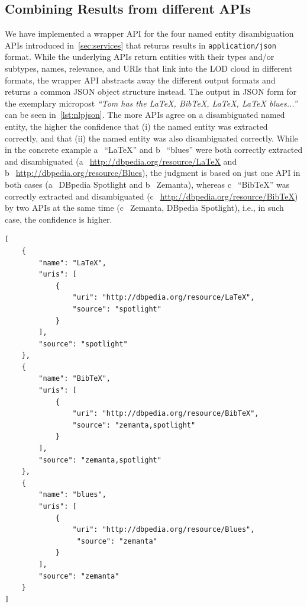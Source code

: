 \documentclass{iosart2c}
\begin{document}
\subsection{Combining Results from different APIs}                     \label{sec:consolidation-nlp}
We have implemented a wrapper API for the four named entity disambiguation APIs introduced in~\autoref{sec:services} that returns results in \texttt{application/json} format.
While the underlying APIs return entities with their types and/or subtypes, names, relevance, and URIs that link into the LOD cloud in different formats, the wrapper API abstracts away the different output formats and returns a common JSON object structure instead.
The output in JSON form for the exemplary micropost \textit{``Tom has the LaTeX, BibTeX, LaTeX, LaTeX blues...''} can be seen in~\autoref{lst:nlpjson}.
The more APIs agree on a disambiguated named entity, the higher the confidence that (i) the named entity was extracted correctly, and that (ii) the named entity was also disambiguated correctly.
While  in the concrete example \textcircled{a}~``LaTeX'' and \textcircled{b}~``blues'' were both correctly extracted and disambiguated (\textcircled{a}~\url{http://dbpedia.org/resource/LaTeX} and \textcircled{b}~\url{http://dbpedia.org/resource/Blues}), the judgment is based on just one API in both cases (\textcircled{a}~DBpedia Spotlight and \textcircled{b}~Zemanta),
whereas \textcircled{c}~``BibTeX'' was correctly extracted and disambiguated (\textcircled{c}~\url{http://dbpedia.org/resource/BibTeX}) by two APIs at the same time (\textcircled{c}~Zemanta, DBpedia Spotlight), i.e., in such case, the confidence is higher.

\begin{lstlisting}[caption={Named entity disambiguation wrapper API output in JSON form for the micropost \textit{``Tom has the LaTeX, BibTeX, LaTeX, LaTeX blues...''}.},label={lst:nlpjson}]
[
    {
        "name": "LaTeX",
        "uris": [
            {
                "uri": "http://dbpedia.org/resource/LaTeX",
                "source": "spotlight"
            }
        ],
        "source": "spotlight"
    },
    {
        "name": "BibTeX",
        "uris": [
            {
                "uri": "http://dbpedia.org/resource/BibTeX",
                "source": "zemanta,spotlight"
            }
        ],
        "source": "zemanta,spotlight"
    },
    {
        "name": "blues",
        "uris": [
            {
                "uri": "http://dbpedia.org/resource/Blues",
                 "source": "zemanta"
            }
        ],
        "source": "zemanta"
    }    
]
\end{lstlisting}
\end{document}
